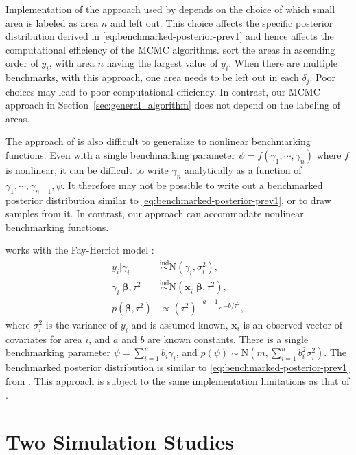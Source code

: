 \documentclass[12pt]{article}
\newcommand{\ind}{\stackrel{\text{ind}}{\sim}}
\begin{document}
Implementation of the approach used by \citet{nandram2011constraint} depends on the choice of which small area is labeled as area $n$ and left out. This choice affects the specific posterior distribution derived in \eqref{eq:benchmarked-posterior-prev1} and hence affects the computational efficiency of the MCMC algorithms.  \citet{nandram2011constraint} sort the areas in ascending order of $y_i$, with area $n$ having the largest value of $y_i$.  When there are multiple benchmarks, with this approach, one area needs to be left out in each $\delta_j$. Poor choices may lead to poor computational efficiency. In contrast, our MCMC approach in Section~\ref{sec:general_algorithm} does not depend on the labeling of areas.

The approach of \citet{nandram2011constraint} is also difficult to generalize to nonlinear benchmarking functions.  Even with a single benchmarking parameter $\psi=f(\gamma_1,\cdots,\gamma_n)$ where $f$ is nonlinear, it can be difficult to write $\gamma_n$ analytically as a function of $\gamma_1,\cdots,\gamma_{n-1},\psi$. It therefore may not be possible to write out a benchmarked posterior distribution similar to \eqref{eq:benchmarked-posterior-prev1}, or to draw samples from it.  In contrast, our approach can accommodate nonlinear benchmarking functions.

\citet{vesper2013three} works with the Fay-Herriot model \citep{fay1979estimates}:
\begin{align}
y_i|\gamma_i&\ind \text{N}(\gamma_i,\sigma_i^2),\\
\gamma_i|\bm{\beta},\tau^2&\ind \text{N}(\bm{x}_i^{\top}\bm{\beta},\tau^2),\\
p(\bm{\beta},\tau^2)&\propto (\tau^2)^{-a-1}e^{-b/\tau^2},
\end{align}
where $\sigma_i^2$ is the variance of $y_i$ and is assumed known, $\bm{x}_i$ is an observed vector of covariates for area $i$, and $a$ and $b$ are known constants.  There is a single benchmarking parameter $\psi=\sum_{i=1}^n b_i\gamma_i$, and $p(\psi) \sim \text{N}(m,\sum_{i=1}^n b_i^2\sigma_i^2)$.  The benchmarked posterior distribution is similar to \eqref{eq:benchmarked-posterior-prev1} from \citet{nandram2011constraint}.  This approach is subject to the same implementation limitations as that of \citet{nandram2011constraint}.


\section{Two Simulation Studies}
  \label{sec:simu}
\end{document}
